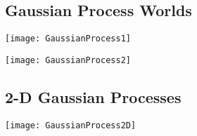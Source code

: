 
\begin{slide}
\section{Gaussian Process Worlds}

\begin{center}
  \texttt{[image: GaussianProcess1]}\pause
  \\
  \hfill

  \texttt{[image: GaussianProcess2]}\pauseb
\end{center}
\end{slide}


\begin{slide}
\section{2-D Gaussian Processes}

\begin{center}
  \texttt{[image: GaussianProcess2D]}
\end{center}

\end{slide}



\Outline %

